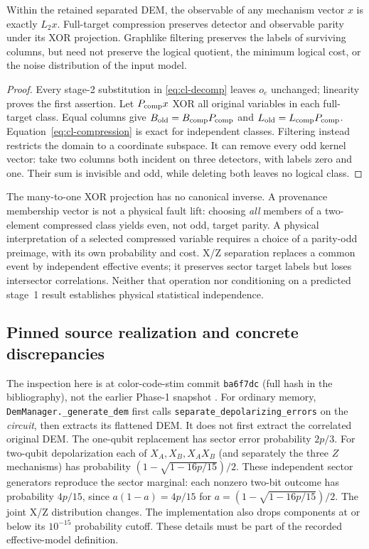 \begin{proposition}
\label{prop:cl-faithful}
Within the retained separated DEM, the observable of any mechanism vector
$x$ is exactly $L_2x$. Full-target compression preserves detector and
observable parity under its XOR projection. Graphlike filtering preserves
the labels of surviving columns, but need not preserve the logical quotient,
the minimum logical cost, or the noise distribution of the input model.
\end{proposition}
\begin{proof}
Every stage-2 substitution in \eqref{eq:cl-decomp} leaves $o_e$ unchanged;
linearity proves the first assertion. Let $P_{\rm comp}x$ XOR all original
variables in each full-target class. Equal columns give
$B_{\rm old}=B_{\rm comp}P_{\rm comp}$ and
$L_{\rm old}=L_{\rm comp}P_{\rm comp}$. Equation~\eqref{eq:cl-compression}
is exact for independent classes. Filtering instead restricts the domain
to a coordinate subspace. It can remove every odd kernel vector: take two
columns both incident on three detectors, with labels zero and one. Their
sum is invisible and odd, while deleting both leaves no logical class.
\end{proof}
The many-to-one XOR projection has no canonical inverse. A provenance
membership vector is not a physical fault lift: choosing \emph{all} members
of a two-element compressed class yields even, not odd, target parity.
A physical interpretation of a selected compressed variable requires a
choice of a parity-odd preimage, with its own probability and cost.
X/Z separation replaces a common event by independent effective events;
it preserves sector target labels but loses intersector correlations.
Neither that operation nor conditioning on a predicted stage~1 result
establishes physical statistical independence.

\subsection{Pinned source realization and concrete discrepancies}
The inspection here is at color-code-stim commit
\texttt{ba6f7dc} (full hash in the bibliography), not the earlier Phase-1
snapshot \cite{CircuitImplementation}. For ordinary memory,
\texttt{DemManager.\_generate\_dem} first calls
\texttt{separate\_depolarizing\_errors} on the \emph{circuit}, then extracts
its flattened DEM. It does not first extract the correlated original DEM.
The one-qubit replacement has sector error probability $2p/3$.
For two-qubit depolarization each of $X_A,X_B,X_AX_B$ (and separately the
three $Z$ mechanisms) has probability
$(1-\sqrt{1-16p/15})/2$. These independent sector generators reproduce the
sector marginal: each nonzero two-bit outcome has probability $4p/15$,
since $a(1-a)=4p/15$ for $a=(1-\sqrt{1-16p/15})/2$.
The joint X/Z distribution changes. The implementation
also drops components at or below its $10^{-15}$ probability cutoff.
These details must be part of the recorded effective-model definition.

